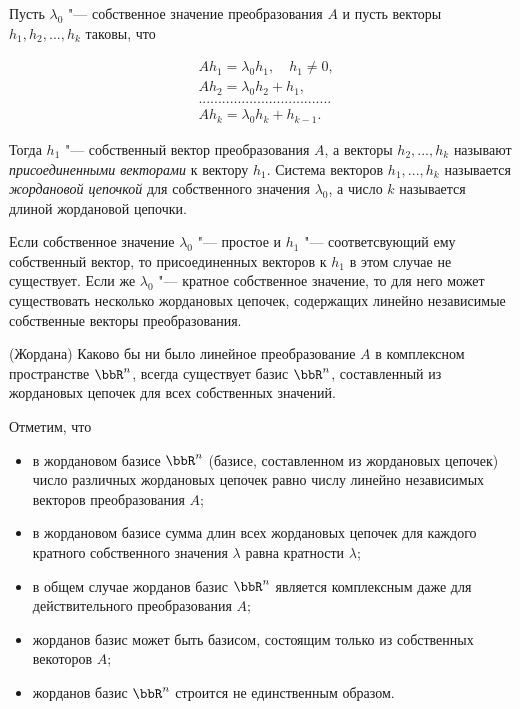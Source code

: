 \begin{defn}
Пусть $\lambda_0$ "--- собственное значение преобразования $A$ и пусть векторы $h_1,h_2,...,h_k$ таковы, что 

\begin{equation} \label{27eq2.3}
\begin{aligned}
&Ah_1=\lambda_0h_1,\quad h_1\neq 0,\\
&Ah_2=\lambda_0h_2+h_1,\\
&..................................\\
&Ah_k=\lambda_0h_k+h_{k-1}.
\end{aligned}
\end{equation}

Тогда $h_1$ "--- собственный вектор преобразования $A$, а векторы $h_2,...,h_k$ называют \textit{присоединенными векторами} к вектору $h_1$. Система векторов $h_1,...,h_k$ называется \textit{жордановой цепочкой} для собственного значения $\lambda_0$, а число $k$ называется длиной жордановой цепочки.

Если собственное значение $\lambda_0$ "--- простое и $h_1$ "--- соответсвующий ему собственный вектор, то присоединенных векторов к $h_1$ в этом случае не существует. Если же $\lambda_0$ "--- кратное собственное значение, то для него может существовать несколько жордановых цепочек, содержащих линейно независимые собственные векторы преобразования.   

\end{defn}

\begin{thm}\label{27thmJ} (Жордана)
Каково бы ни было линейное преобразование $A$ в комплексном пространстве $\bbR^n$, всегда существует базис $\bbR^n$, составленный из жордановых цепочек для всех собственных значений.
\end{thm}

Отметим, что 
\begin{itemize} 
\item в жордановом базисе $\bbR^n$ (базисе, составленном из жордановых цепочек) число различных жордановых цепочек равно числу линейно независимых векторов преобразования $A$;
\item в жордановом базисе сумма длин всех жордановых цепочек для каждого кратного собственного значения $\lambda$ равна кратности $\lambda$;
\item в общем случае жорданов базис $\bbR^n$ является комплексным даже для действительного преобразования $A$;
\item жорданов базис может быть базисом, состоящим только из собственных векоторов $A$;
\item жорданов базис $\bbR^n$ строится не единственным образом.
\end{itemize}

